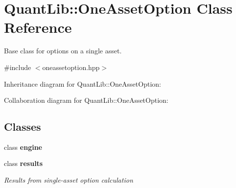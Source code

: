 \section{Quant\+Lib\+:\+:One\+Asset\+Option Class Reference}
\label{class_quant_lib_1_1_one_asset_option}


Base class for options on a single asset.  




{\ttfamily \#include $<$oneassetoption.\+hpp$>$}



Inheritance diagram for Quant\+Lib\+:\+:One\+Asset\+Option\+:


Collaboration diagram for Quant\+Lib\+:\+:One\+Asset\+Option\+:
\subsection*{Classes}
\begin{DoxyCompactItemize}
\item 
class {\bf engine}
\item 
class {\bf results}
\begin{DoxyCompactList}\small\item\em Results from single-\/asset option calculation \end{DoxyCompactList}\end{DoxyCompactItemize}
